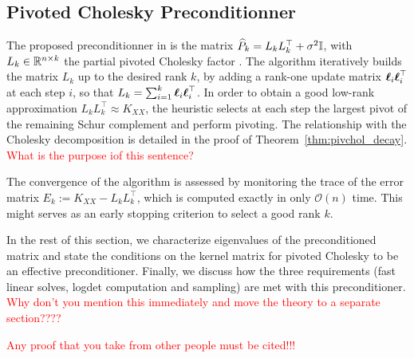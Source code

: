 \documentclass{article}
\begin{document}
{\subsection{Pivoted Cholesky Preconditionner}

The proposed preconditionner in \cite{gardner_gpytorch_2021} is the matrix $\widehat P_k = L_k L_k^\top + \sigma^2 \Id$, with $L_k \in \mathbb {\mathbb R}^{n \times k}$ the partial pivoted Cholesky factor \cite{harbrecht_low-rank_2012}. 
The algorithm iteratively builds the matrix $L_k$ up to the desired rank $k$, by adding a rank-one update matrix $\boldsymbol{\mathbf{\ell}}_i \boldsymbol{\mathbf{\ell}}_i^\top$ at each step $i$, so that $L_k = \sum_{i=1}^k \boldsymbol{\mathbf{\ell}}_i \boldsymbol{\mathbf{\ell}}_i^\top$. In order to obtain a good low-rank approximation $L_kL_k^\top \approx K_{XX}$, the heuristic selects at each step the largest pivot of the remaining Schur complement and perform pivoting. 
The relationship with the Cholesky decomposition is detailed in the proof of Theorem~\ref{thm:pivchol_decay}. \textcolor{red}{What is the purpose iof this sentence?}

The convergence of the algorithm is assessed by monitoring the trace of the error matrix $E_k := K_{XX} - L_kL_k^\top$, which is computed exactly in only $\mathcal O(n)$ time. This might serves as an early stopping criterion to select a good rank $k$. 

In the rest of this section, we characterize eigenvalues of the preconditioned matrix and state the conditions on the kernel matrix for pivoted Cholesky to be an effective preconditioner. Finally, we discuss how the three requirements (fast linear solves, logdet computation and sampling) are met with this preconditioner. \textcolor{red}{Why don't you mention this immediately and move the theory to a separate section????} 

\textcolor{red}{Any proof that you take from other people must be cited!!!}

}
\end{document}
